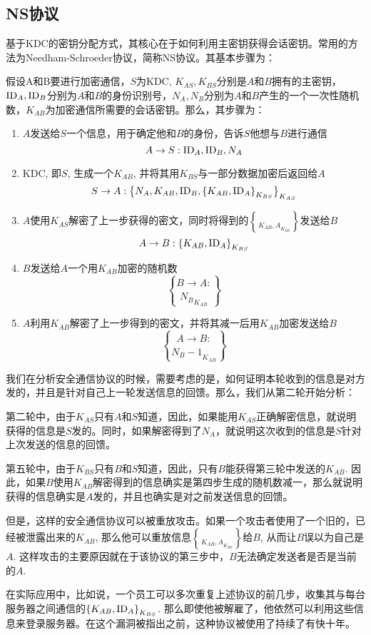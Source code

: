 \subsection{NS协议}
基于KDC的密钥分配方式，其核心在于如何利用主密钥获得会话密钥。常用的方法为Needham-Schroeder协议，简称NS协议。其基本步骤为：\par
假设A和B要进行加密通信，$S$为KDC, $K_{AS}, K_{BS}$分别是$A$和$B$拥有的主密钥，$\mathrm{ID}_A, \mathrm{ID}_B$分别为$A$和$B$的身份识别号，$N_A, N_B$分别为$A$和$B$产生的一个一次性随机数，$K_{AB}$为加密通信所需要的会话密钥。那么，其步骤为：
\begin{enumerate}
	\item $A$发送给$S$一个信息，用于确定他和$B$的身份，告诉$S$他想与$B$进行通信
	\[A\to S: \mathrm{ID}_A, \mathrm{ID}_B, N_A\]
	\item KDC, 即$S$, 生成一个$K_{AB}$, 并将其用$K_{BS}$与一部分数据加密后返回给$A$
	\[S\to A: \left\{ {N_A, K_{AB}, \mathrm{ID}_B, \left\{ {K_{AB}, \mathrm{ID}_A} \right\}_{K_{BS}}} \right\}_{K_{AS}}\]
	\item $A$使用$K_{AS}$解密了上一步获得的密文，同时将得到的$\brace{K_{AB}, A}_{K_{BS}}$发送给$B$
	\[A\to B: \left\{ {K_{AB}, \mathrm{ID}_A} \right\}_{K_{BS}}\]
	\item $B$发送给$A$一个用$K_{AB}$加密的随机数
	\[B\to A: \brace{N_B}_{K_{AB}}\]
	\item $A$利用$K_{AB}$解密了上一步得到的密文，并将其减一后用$K_{AB}$加密发送给$B$
	\[A\to B: \brace{N_B - 1}_{K_{AB}}\]
\end{enumerate}

我们在分析安全通信协议的时候，需要考虑的是，如何证明本轮收到的信息是对方发的，并且是针对自己上一轮发送信息的回馈。那么，我们从第二轮开始分析：\par
第二轮中，由于$K_{AS}$只有$A$和$S$知道，因此，如果能用$K_{AS}$正确解密信息，就说明获得的信息是$S$发的。同时，如果解密得到了$N_A$，就说明这次收到的信息是$S$针对上次发送的信息的回馈。\par
第五轮中，由于$K_{BS}$只有$B$和$S$知道，因此，只有$B$能获得第三轮中发送的$K_{AB}$. 因此，如果$B$使用$K_{AB}$解密得到的信息确实是第四步生成的随机数减一，那么就说明获得的信息确实是$A$发的，并且也确实是对之前发送信息的回馈。\par
但是，这样的安全通信协议可以被重放攻击。如果一个攻击者使用了一个旧的，已经被泄露出来的$K_{AB}$, 那么他可以重放信息$\brace{K_{AB}, A}_{K_{BS}}$给$B$, 从而让$B$误以为自己是$A$. 这样攻击的主要原因就在于该协议的第三步中，$B$无法确定发送者是否是当前的$A$.\par
在实际应用中，比如说，一个员工可以多次重复上述协议的前几步，收集其与每台服务器之间通信的$\left\{ {K_{AB}, \mathrm{ID}_A} \right\}_{K_{BS}}$. 那么即使他被解雇了，他依然可以利用这些信息来登录服务器。在这个漏洞被指出之前，这种协议被使用了持续了有快十年。
